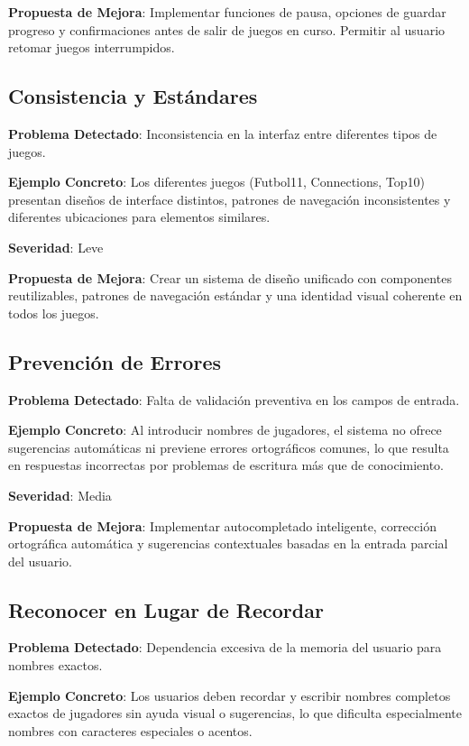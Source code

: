 \documentclass{article}
\begin{document}
	\noindent
	\textbf{Propuesta de Mejora}: Implementar funciones de pausa, opciones de guardar progreso y confirmaciones antes de salir de juegos en curso. Permitir al usuario retomar juegos interrumpidos.

	\subsection{Consistencia y Estándares}
	\noindent
	\textbf{Problema Detectado}: Inconsistencia en la interfaz entre diferentes tipos de juegos.
	
	\noindent
	\textbf{Ejemplo Concreto}: Los diferentes juegos (Futbol11, Connections, Top10) presentan diseños de interface distintos, patrones de navegación inconsistentes y diferentes ubicaciones para elementos similares.
	
	\noindent
	\textbf{Severidad}: Leve
	
	\noindent
	\textbf{Propuesta de Mejora}: Crear un sistema de diseño unificado con componentes reutilizables, patrones de navegación estándar y una identidad visual coherente en todos los juegos.

	\subsection{Prevención de Errores}
	\noindent
	\textbf{Problema Detectado}: Falta de validación preventiva en los campos de entrada.
	
	\noindent
	\textbf{Ejemplo Concreto}: Al introducir nombres de jugadores, el sistema no ofrece sugerencias automáticas ni previene errores ortográficos comunes, lo que resulta en respuestas incorrectas por problemas de escritura más que de conocimiento.
	
	\noindent
	\textbf{Severidad}: Media
	
	\noindent
	\textbf{Propuesta de Mejora}: Implementar autocompletado inteligente, corrección ortográfica automática y sugerencias contextuales basadas en la entrada parcial del usuario.

	\subsection{Reconocer en Lugar de Recordar}
	\noindent
	\textbf{Problema Detectado}: Dependencia excesiva de la memoria del usuario para nombres exactos.
	
	\noindent
	\textbf{Ejemplo Concreto}: Los usuarios deben recordar y escribir nombres completos exactos de jugadores sin ayuda visual o sugerencias, lo que dificulta especialmente nombres con caracteres especiales o acentos.
	
\end{document}
